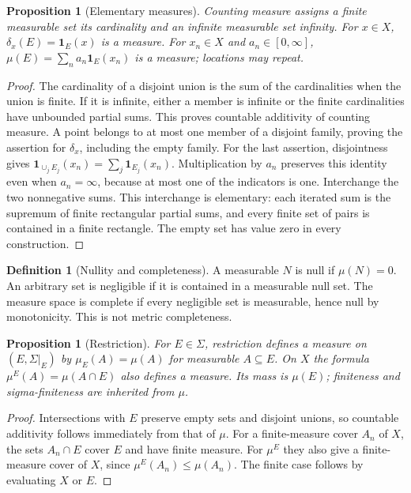 \documentclass[11pt,oneside,openany]{book}
\newtheorem{proposition}[theorem]{Proposition}
\theoremstyle{definition}
\newtheorem{definition}[theorem]{Definition}
\theoremstyle{remark}
\newcommand{\one}{\mathbf1}\newcommand{\ind}[1]{\mathbf1_{#1}}
\newcommand{\Eplus}{[0,\infty]}
\newcommand{\family}[1]{}
\begin{document}
\begin{proposition}[Elementary measures]
\family{D11.01.elementary_measures}\label{d11:01:elementary-measures}
Counting measure assigns a finite measurable set its cardinality and an infinite
measurable set infinity. For $x\in X$, $\delta_x(E)=\one_E(x)$ is a measure.
For $x_n\in X$ and $a_n\in\Eplus$,
$\mu(E)=\sum_n a_n\one_E(x_n)$ is a measure; locations may repeat.
\end{proposition}
\begin{proof}
The cardinality of a disjoint union is the sum of the cardinalities when the
union is finite. If it is infinite, either a member is infinite or the finite
cardinalities have unbounded partial sums. This proves countable additivity
of counting measure. A point belongs to at most one member of a disjoint
family, proving the assertion for $\delta_x$, including the empty family.
For the last assertion, disjointness gives
$\one_{\cup_j E_j}(x_n)=\sum_j\one_{E_j}(x_n)$. Multiplication by $a_n$
preserves this identity even when $a_n=\infty$, because at most one of the
indicators is one. Interchange the two nonnegative sums. This interchange
is elementary: each iterated sum is the supremum of finite rectangular
partial sums, and every finite set of pairs is contained in a finite rectangle.
The empty set has value zero in every construction.
\end{proof}

\begin{definition}[Nullity and completeness]
\family{D11.01.null_complete}\label{d11:01:null-complete}
A measurable $N$ is null if $\mu(N)=0$. An arbitrary set is negligible if it
is contained in a measurable null set. The measure space is complete if every
negligible set is measurable, hence null by monotonicity. This is not metric
completeness.
\end{definition}

\begin{proposition}[Restriction]
\family{D11.01.restriction_measure}\label{d11:01:restriction-measure}
For $E\in\Sigma$, restriction defines a measure on $(E,\Sigma|_E)$ by
$\mu_E(A)=\mu(A)$ for measurable $A\subseteq E$. On $X$ the formula
$\mu^E(A)=\mu(A\cap E)$ also defines a measure. Its mass is $\mu(E)$;
finiteness and sigma-finiteness are inherited from $\mu$.
\end{proposition}
\begin{proof}
Intersections with $E$ preserve empty sets and disjoint unions, so countable
additivity follows immediately from that of $\mu$. For a finite-measure
cover $A_n$ of $X$, the sets $A_n\cap E$ cover $E$ and have finite measure.
For $\mu^E$ they also give a finite-measure cover of $X$, since
$\mu^E(A_n)\leq\mu(A_n)$. The finite case follows by evaluating $X$ or $E$.
\end{proof}
\end{document}
